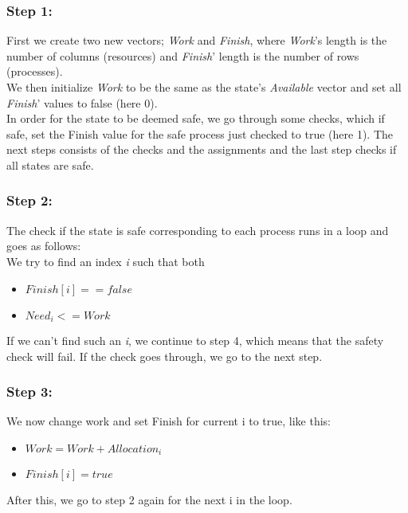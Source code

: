 \subsubsection{Step 1:}
First we create two new vectors; \textit{Work} and \textit{Finish}, where \textit{Work}'s length is the number of columns (resources) and \textit{Finish}' length is the number of rows (processes).\\

We then initialize \textit{Work} to be the same as the state's \textit{Available} vector and set all \textit{Finish}' values to false (here 0).\\

In order for the state to be deemed safe, we go through some checks, which if safe, set the Finish value for the safe process just checked to true (here 1). The next steps consists of the checks and the assignments and the last step checks if all states are safe.

\subsubsection{Step 2:}
The check if the state is safe corresponding to each process runs in a loop and goes as follows:\\

We try to find an index \textit{i} such that both

\begin{itemize}
\item $Finish[i]== false$
\item $Need_i <= Work$
\end{itemize}

If we can't find such an \textit{i}, we continue to step 4, which means that the safety check will fail. If the check goes through, we go to the next step.

\subsubsection{Step 3:}
We now change work and set Finish for current i to true, like this:

\begin{itemize}
\item $Work = Work + Allocation_i$
\item $Finish[i] = true$
\end{itemize}

After this, we go to step 2 again for the next i in the loop.

